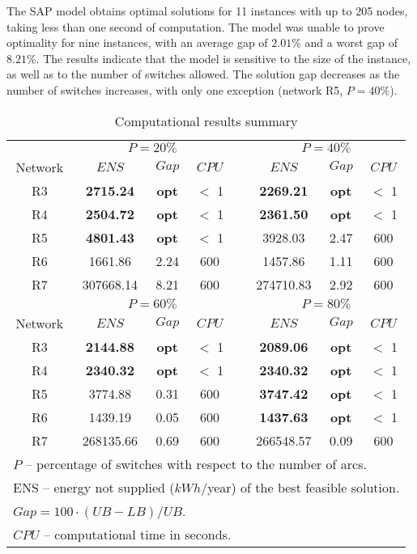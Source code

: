 \documentclass{article}
\begin{document}
The SAP model obtains optimal solutions for 11 instances with up to 205 nodes, taking less than one second of computation. The model was unable to prove optimality for nine instances, with an average gap of $2.01\%$ and a worst gap of $8.21\%$. 
The results indicate that the model is sensitive to the size of the instance, as well as to the number of switches allowed. The solution gap decreases as the number of switches increases, with only one exception (network R5, $P = 40\%$). 


\begin{table}[ht!]
\caption{Computational results summary}
\begin{center} {
\begin{tabular}{ c c c c p{0.1cm} c c c } \label{tbl:results}
\\ 
 \cline{1-8}
 & \multicolumn{3}{c}{$P = 20\%$} &  & \multicolumn{3}{c}{$P = 40\%$} \\ \cline{2-4} \cline{6-8} 
 Network &  $ENS$ & $Gap$ & $CPU$ & & $ENS$ & $Gap$ & $CPU$ \\ \hline
R3 &  \textbf{2715.24} & \textbf{opt} & $<$ 1 &  & \textbf{2269.21} & \textbf{opt} & $<$ 1  \\ 
R4 &  \textbf{2504.72} & \textbf{opt} & $<$ 1 &  & \textbf{2361.50} & \textbf{opt} & $<$ 1   \\ 
R5 &  \textbf{4801.43} & \textbf{opt} & $<$ 1 &  & 3928.03 & 2.47 & 600 \\ 
R6 & 1661.86 & 2.24 & 600 &  & 1457.86 & 1.11 & 600 \\ 
R7 &  307668.14 & 8.21 & 600 &  & 274710.83 & 2.92 & 600 \\ 
 
  & \multicolumn{3}{c}{$P = 60\%$} &  & \multicolumn{3}{c}{$P = 80\%$} \\ \cline{2-4} \cline{6-8} 
 Network  & $ENS$ & $Gap$ & $CPU$ & & $ENS$ & $Gap$ & $CPU$ \\ \hline
R3 &  \textbf{2144.88}  & \textbf{opt} & $<$ 1 &  & \textbf{2089.06} & \textbf{opt} & $<$ 1  \\ 
R4 &  \textbf{2340.32} & \textbf{opt} & $<$ 1 &  & \textbf{2340.32} & \textbf{opt} & $<$ 1 \\ 
R5 &   3774.88 & 0.31 & 600 &  & \textbf{3747.42} & \textbf{opt} & $<$ 1 \\ 
R6 &  1439.19 & 0.05 & 600 &  & \textbf{1437.63} & \textbf{opt} & $<$ 1 \\ 
R7 &  268135.66 & 0.69 & 600 &  & 266548.57 & 0.09 & 600 \\ \hline
\multicolumn{8}{l}{$P$ -- percentage of switches with respect to the number of arcs.} \\
\multicolumn{8}{l}{ENS -- energy not supplied ($kWh$/year) of the best feasible solution.} \\
\multicolumn{8}{l}{$Gap = 100\cdot(UB-LB)/UB$.} \\
\multicolumn{8}{l}{$CPU$ -- computational time in seconds.} \\
\end{tabular} } 
\end{center} \end{table}
\end{document}
